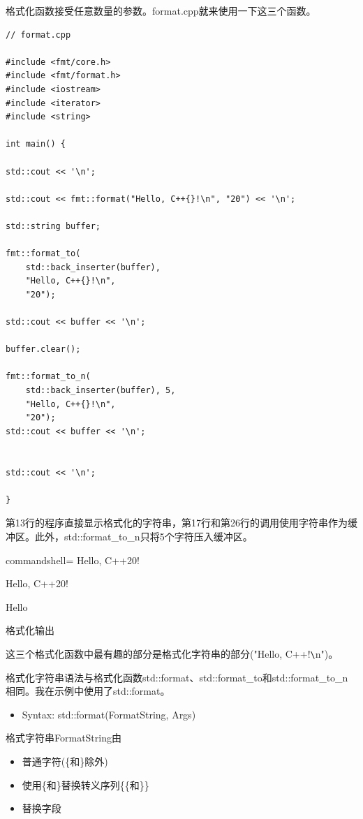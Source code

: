 格式化函数接受任意数量的参数。format.cpp就来使用一下这三个函数。

\begin{lstlisting}[style=styleCXX]
// format.cpp

#include <fmt/core.h>
#include <fmt/format.h>
#include <iostream>
#include <iterator>
#include <string>

int main() {

std::cout << '\n';

std::cout << fmt::format("Hello, C++{}!\n", "20") << '\n';

std::string buffer;

fmt::format_to(
	std::back_inserter(buffer),
	"Hello, C++{}!\n",
	"20");

std::cout << buffer << '\n';

buffer.clear();

fmt::format_to_n(
	std::back_inserter(buffer), 5,
	"Hello, C++{}!\n",
	"20");
std::cout << buffer << '\n';


std::cout << '\n';

}
\end{lstlisting}

第13行的程序直接显示格式化的字符串，第17行和第26行的调用使用字符串作为缓冲区。此外，std::format\_to\_n只将5个字符压入缓冲区。

\begin{tcblisting}{commandshell={}}
Hello, C++20!

Hello, C++20!

Hello
\end{tcblisting}

\begin{center}
格式化输出
\end{center}

这三个格式化函数中最有趣的部分是格式化字符串的部分("Hello, C++{}!\verb|\|n")。


格式化字符串语法与格式化函数std::format、std::format\_to和std::format\_to\_n相同。我在示例中使用了std::format。

\begin{itemize}
\item 
Syntax: std::format(FormatString, Args)
\end{itemize}

格式字符串FormatString由

\begin{itemize}
\item 
普通字符(\{和\}除外)

\item 
使用\{和\}替换转义序列\{\{和\}\}

\item 
替换字段
\end{itemize}

